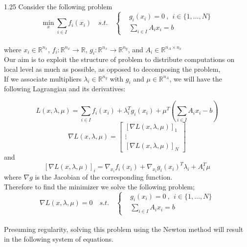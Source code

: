 \section{}
\begin{spacing}{1.25}
Consider the following problem \\
    \[
        \min_x \sum\limits_{i \in I} f_{i}(x_{i}) \quad s.t. \quad
        \begin{cases} & g_i(x_i) = 0\:,\ \  i \in \bigl\{ 1,\ldots,N \bigr\}\\
        & \sum\limits_{i \in I} A_{i} x_{i} = b
        \end{cases}
    \]\\
    where $x_i \in \mathbb{R}^{n_x}$, $f_i : \mathbb{R}^{n_x} \rightarrow \mathbb{R}$, $g_i : \mathbb{R}^{n_x} \rightarrow \mathbb{R}^{n_g}$, and $A_i \in \mathbb{R}^{n_A \times n_x}$ \\
    Our aim is to exploit the structure of problem to distribute computations on local level as much as possible, as opposed to decomposing the problem,\\
    If we associate multipliers $\lambda_i \in \mathbb{R}^{n_g}$ with $g_i$ and $\mu \in \mathbb{R}^{n_A}$, we will have the following Lagrangian and its derivatives:
\end{spacing}

\[
L(x,\lambda,\mu) = \sum\limits_{i \in I} f_{i}(x_{i}) + \lambda_{i}^{T} g_i(x_i) + \mu^T (\sum\limits_{i \in I} A_{i} x_{i} - b)
\]
\[
\nabla L(x,\lambda,\mu) =   
   \begin{bmatrix}
   [\nabla L(x,\lambda,\mu)]_1 \\
   \vdots \\
   [\nabla L(x,\lambda,\mu)]_N 
   \end{bmatrix}
\]
and
\[
[\nabla L(x,\lambda,\mu)]_i = \nabla_{x_i} f_i(x_i) + \nabla_{x_i} g_i(x_i)^{T} \lambda_i + A_{i}^{T} \mu
\]
where $\nabla g$ is the Jacobian of the corresponding function. \\

Therefore to find the minimizer we solve the following problem;
 \[
        \nabla L(x,\lambda,\mu) = 0 \quad s.t. \quad
        \begin{cases} & g_i(x_i) = 0\:,\ \  i \in \bigl\{ 1,\ldots,N \bigr\}\\
        & \sum\limits_{i \in I} A_{i} x_{i} = b
        \end{cases}
    \]\\

Presuming regularity, solving this problem using the Newton method will result in the following system of equations.

